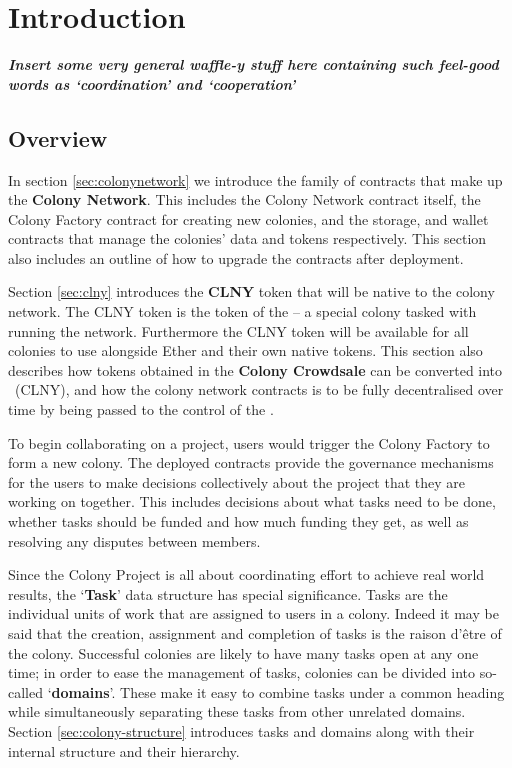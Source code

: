\section{Introduction}


\textbf{\emph{Insert some very general waffle-y stuff here containing such feel-good words as `coordination' and `cooperation'}}

\subsection{Overview}


In section \ref{sec:colonynetwork} we introduce the family of contracts that make up the \textbf{Colony Network}. This includes the Colony Network contract itself, the Colony Factory contract for creating new colonies, and the storage, and wallet contracts that manage the colonies' data and tokens respectively. This section also includes an outline of how to upgrade the contracts after deployment.

Section \ref{sec:clny} introduces the \textbf{CLNY} token that will be native to the colony network. The CLNY token is the token of the \textbf{\rc} -- a special colony tasked with running the network. Furthermore the CLNY token will be available for all colonies to use alongside Ether and their own native tokens. This section also describes how tokens obtained in the \textbf{Colony Crowdsale} can be converted into \rcts\ (CLNY), and how the colony network contracts is to be fully decentralised over time by being passed to the control of the \rc.

To begin collaborating on a project, users would trigger the Colony Factory to form a new colony. The deployed contracts provide the governance mechanisms for the users to make decisions collectively about the project that they are working on together. This includes decisions about what tasks need to be done, whether tasks should be funded and how much funding they get, as well as resolving any disputes between members.

Since the Colony Project is all about coordinating effort to achieve real world results, the `\textbf{Task}' data structure has special significance. Tasks are the individual units of work that are assigned to  users in a colony. Indeed it may be said that the creation, assignment and completion of tasks is the raison d'être of the colony. Successful colonies are likely to have many tasks open at any one time; in order to ease the management of tasks, colonies can be divided into so-called `\textbf{domains}'. These make it easy to combine tasks under a common heading while simultaneously separating these tasks from other unrelated domains. Section \ref{sec:colony-structure} introduces tasks and domains along with their internal structure and their hierarchy.

